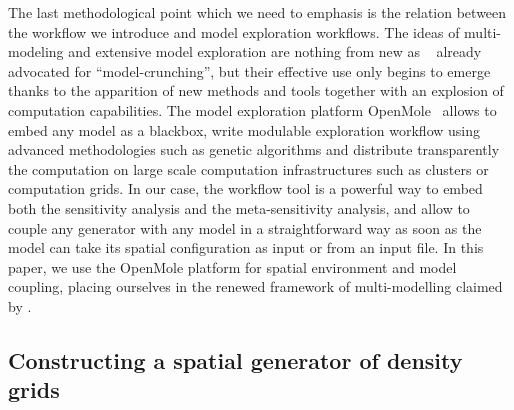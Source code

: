 \documentclass[Royal,sageh,times]{sagej}
\begin{document}



The last methodological point which we need to emphasis is the relation between the workflow we introduce and model exploration workflows. The ideas of multi-modeling and extensive model exploration are nothing from new as ~\cite{openshaw1983data} already advocated for ``model-crunching'', but their effective use only begins to emerge thanks to the apparition of new methods and tools together with an explosion of computation capabilities. The model exploration platform OpenMole~\citep{reuillon2013openmole} allows to embed any model as a blackbox, write modulable exploration workflow using advanced methodologies such as genetic algorithms and distribute transparently the computation on large scale computation infrastructures such as clusters or computation grids. In our case, the workflow tool is a powerful way to embed both the sensitivity analysis and the meta-sensitivity analysis, and allow to couple any generator with any model in a straightforward way as soon as the model can take its spatial configuration as input or from an input file. In this paper, we use the OpenMole platform for spatial environment and model coupling, placing ourselves in the renewed framework of multi-modelling claimed by \citet{cottineau2015modular}.
\subsection{Constructing a spatial generator of density grids}
\end{document}
